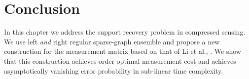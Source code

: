 \section{Conclusion}
In this chapter we address the support recovery problem in compressed sensing. We use left \emph{and} right regular sparse-graph ensemble and propose a new construction for the measurement matrix based on that of Li et al., \cite{li2015subisit}. We show that this construction achieves order optimal measurement cost and achieves asymptotically vanishing error probability in sub-linear time complexity.
%
%
%
